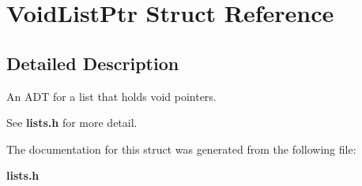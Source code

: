 \section{Void\-List\-Ptr Struct Reference}
\label{structVoidListPtr}


\subsection{Detailed Description}
An ADT for a list that holds void pointers. 

See {\bf lists.h} for more detail. 



The documentation for this struct was generated from the following file:\begin{CompactItemize}
\item 
{\bf lists.h}\end{CompactItemize}
